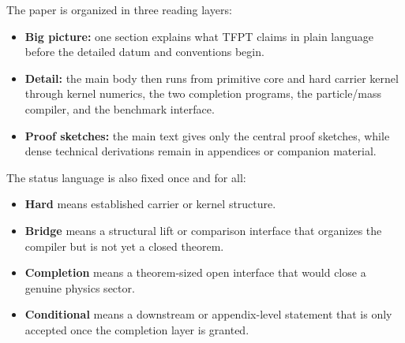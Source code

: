 The paper is organized in three reading layers:
\begin{itemize}[leftmargin=1.5em, topsep=3pt, itemsep=2pt]
    \item \textbf{Big picture:} one section explains what TFPT claims in plain language before the detailed datum and conventions begin.
    \item \textbf{Detail:} the main body then runs from primitive core and hard carrier kernel through kernel numerics, the two completion programs, the particle/mass compiler, and the benchmark interface.
    \item \textbf{Proof sketches:} the main text gives only the central proof sketches, while dense technical derivations remain in appendices or companion material.
\end{itemize}
The status language is also fixed once and for all:
\begin{itemize}[leftmargin=1.5em, topsep=3pt, itemsep=2pt]
    \item \textbf{Hard} means established carrier or kernel structure.
    \item \textbf{Bridge} means a structural lift or comparison interface that organizes the compiler but is not yet a closed theorem.
    \item \textbf{Completion} means a theorem-sized open interface that would close a genuine physics sector.
    \item \textbf{Conditional} means a downstream or appendix-level statement that is only accepted once the completion layer is granted.
\end{itemize}

